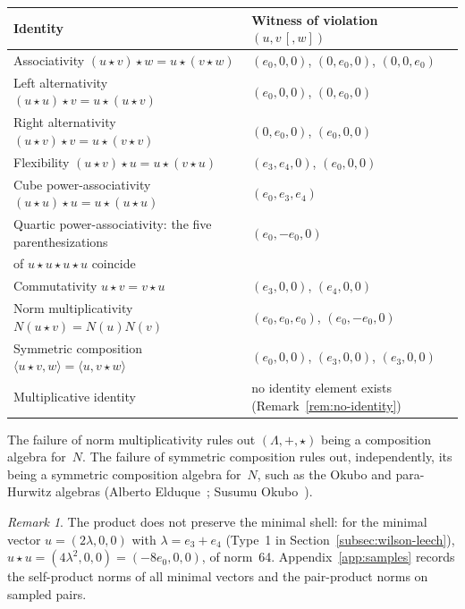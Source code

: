\documentclass[twoside,english]{paper}
\numberwithin{equation}{section}
\numberwithin{figure}{section}
\theoremstyle{definition}
\theoremstyle{remark}
\newtheorem{remark}[theorem]{Remark}
\newcommand{\LL}{\Lambda}             %
\newcommand{\Nrm}{N}                  %
\begin{document}
\begin{center}
\begin{tabular}{@{}ll@{}}
\toprule
Identity & Witness of violation $(u, v\,[, w])$ \\
\midrule
Associativity $(u\star v)\star w = u\star(v\star w)$ &
  $(e_0, 0, 0)$, $(0, e_0, 0)$, $(0, 0, e_0)$ \\
Left alternativity $(u\star u)\star v = u\star(u\star v)$ &
  $(e_0, 0, 0)$, $(0, e_0, 0)$ \\
Right alternativity $(u\star v)\star v = u\star(v\star v)$ &
  $(0, e_0, 0)$, $(e_0, 0, 0)$ \\
Flexibility $(u\star v)\star u = u\star(v\star u)$ &
  $(e_3, e_4, 0)$, $(e_0, 0, 0)$ \\
Cube power-associativity $(u\star u)\star u = u\star(u\star u)$ &
  $(e_0, e_3, e_4)$ \\
Quartic power-associativity: the five parenthesizations &
  $(e_0, -e_0, 0)$ \\
\quad of $u\star u\star u\star u$ coincide & \\
Commutativity $u\star v = v\star u$ &
  $(e_3, 0, 0)$, $(e_4, 0, 0)$ \\
Norm multiplicativity $\Nrm(u\star v) = \Nrm(u)\Nrm(v)$ &
  $(e_0, e_0, e_0)$, $(e_0, -e_0, 0)$ \\
Symmetric composition $\langle u\star v, w\rangle =
  \langle u, v\star w\rangle$ &
  $(e_0, 0, 0)$, $(e_3, 0, 0)$, $(e_3, 0, 0)$ \\
Multiplicative identity &
  no identity element exists (Remark~\ref{rem:no-identity}) \\
\bottomrule
\end{tabular}
\end{center}

The failure of norm multiplicativity rules out $(\LL, +, \star)$
being a composition algebra for~$\Nrm$.  The failure of
symmetric composition rules out, independently, its being a symmetric
composition algebra for~$\Nrm$, such as the Okubo and para-Hurwitz
algebras (Alberto Elduque~\cite{Elduque2000_Triality,
Elduque2023_IsotropicNorm}; Susumu Okubo~\cite{Okubo1995_Book}).

\begin{remark}\label{rem:product-norms}
The product does not preserve the minimal shell: for the minimal
vector $u = (2\lambda, 0, 0)$ with $\lambda = e_3 + e_4$ (Type~1 in
Section~\ref{subsec:wilson-leech}), $u \star u = (4\lambda^2, 0, 0) =
(-8e_0, 0, 0)$, of norm~64.  Appendix~\ref{app:samples} records the
self-product norms of all minimal vectors and the pair-product norms on
sampled pairs.
\end{remark}
\end{document}
